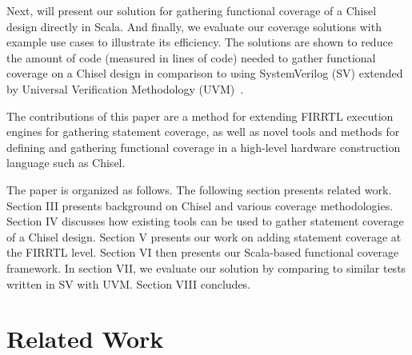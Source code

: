 \documentclass[conference]{IEEEtran}
\newcommand{\martin}[1]{{\color{blue} Martin: #1}}
\begin{document}
Next, will present our solution for gathering functional coverage of a Chisel design directly in Scala. %
And finally, we evaluate our coverage solutions with example use cases to illustrate its efficiency. The solutions are shown to reduce the amount of code (measured in lines of code) needed to gather functional coverage on a Chisel design in comparison to using SystemVerilog (SV) extended by Universal Verification Methodology (UVM)~\cite{uvm2015}.

The contributions of this paper are a method for extending FIRRTL execution engines for gathering statement coverage, 
as well as novel tools and methods for defining and gathering functional coverage in a high-level hardware construction language such as Chisel.

The paper is organized as follows. 
The following section presents related work. 
Section III presents background on Chisel and various coverage methodologies. 
Section IV discusses how existing tools can be used to gather statement coverage of a Chisel design.  
Section V presents our work on adding statement coverage at the FIRRTL level. 
Section VI then presents our Scala-based functional coverage framework.  
In section VII, we evaluate our solution by comparing to similar tests written in SV with UVM. 
Section VIII concludes.

\section{Related Work}

\end{document}
